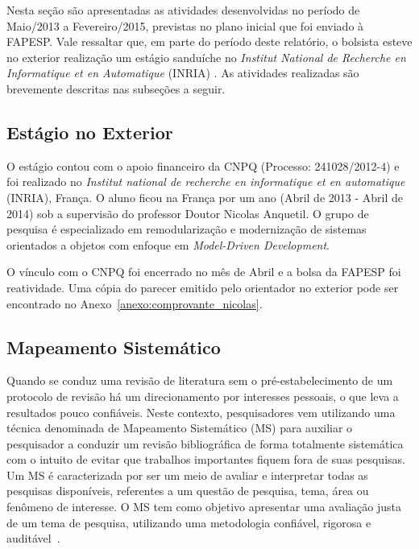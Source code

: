 Nesta seção são apresentadas as atividades desenvolvidas no período de Maio/2013 a Fevereiro/2015, previstas no plano inicial que foi enviado à FAPESP. Vale ressaltar que, em parte do período deste relatório, o bolsista esteve no exterior realização um estágio sanduíche no \textit{Institut National de Recherche en Informatique et en Automatique} (INRIA) . As atividades realizadas são brevemente descritas nas subseções a seguir.

\subsection{Estágio no Exterior}

O estágio contou com o apoio financeiro da CNPQ (Processo: 241028/2012-4) e foi realizado no \textit{Institut national de recherche en informatique et en automatique} (INRIA), França. O aluno ficou na França por um ano (Abril de 2013 - Abril de 2014) sob a supervisão do professor Doutor Nicolas Anquetil. O grupo de pesquisa é especializado em remodularização e modernização de sistemas orientados a objetos com enfoque em \textit{Model-Driven Development}. 

O vínculo com o CNPQ foi encerrado no mês de Abril e a bolsa da FAPESP foi reatividade. Uma cópia do parecer emitido pelo orientador no exterior pode ser encontrado no Anexo~\ref{anexo:comprovante_nicolas}.

\subsection{Mapeamento Sistemático}

Quando se conduz uma revisão de literatura sem o pré-estabelecimento de um protocolo de revisão há um direcionamento por interesses pessoais, o que leva a resultados pouco confiáveis. Neste contexto, pesquisadores vem utilizando uma técnica denominada de Mapeamento Sistemático (MS) para auxiliar o pesquisador a conduzir um revisão bibliográfica de forma totalmente sistemática com o intuito de evitar que trabalhos importantes fiquem fora de suas pesquisas. Um MS é caracterizada por ser um meio de avaliar e interpretar todas as pesquisas disponíveis, referentes a um questão de pesquisa, tema, área ou fenômeno de interesse. O MS tem como objetivo apresentar uma avaliação justa de um tema de pesquisa, utilizando uma metodologia confiável, rigorosa e auditável~\cite{kit04}.

